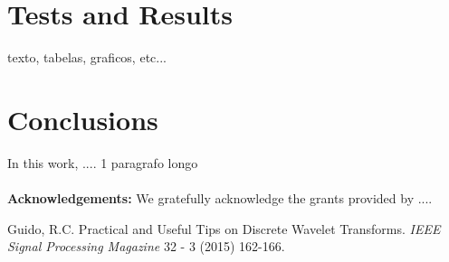 \documentclass[3p,times]{elsarticle}
\begin{document}
\section{Tests and Results}
\label{ea}
\par texto, tabelas, graficos, etc...
\section{Conclusions}
\label{co}
\par In this work, .... 1 paragrafo longo
\\
\\
\textbf{Acknowledgements:} We gratefully acknowledge the grants provided by ....
\begin{thebibliography}{00}
Guido, R.C. Practical and Useful Tips on Discrete Wavelet Transforms. \textit{IEEE Signal Processing Magazine} 32 - 3 (2015) 162-166. 
\end{thebibliography}
\end{document}
